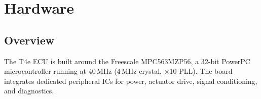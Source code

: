 \documentclass[a4paper,11pt]{article}
\renewcommand{\_}{\oldunderscore\allowbreak}
\begin{document}
\section{Hardware}

\subsection{Overview}

The T4e ECU is built around the Freescale MPC563MZP56, a 32-bit PowerPC
microcontroller running at 40\,MHz (4\,MHz crystal, $\times$10 PLL). The board
integrates dedicated peripheral ICs for power, actuator drive, signal
conditioning, and diagnostics.
\end{document}
